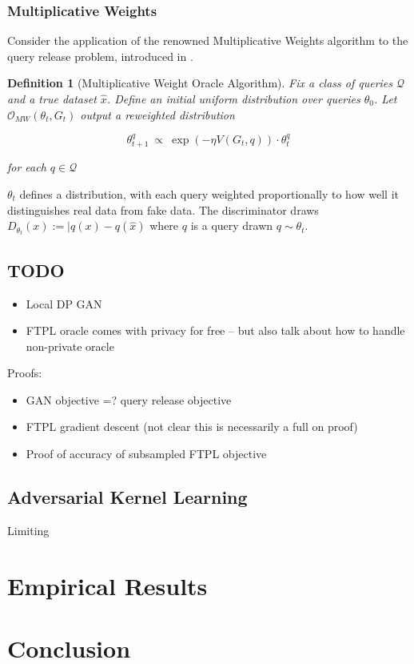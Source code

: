 \documentclass[]{article}
\newtheorem{definition}{Definition}[section]
\theoremstyle{definition}
\begin{document}
\subsubsection{Multiplicative Weights}

Consider the application of the renowned Multiplicative Weights algorithm to the query release problem, introduced in \cite{HR10}. 

\begin{definition}[Multiplicative Weight Oracle Algorithm]
    Fix a class of queries $\mathcal{Q}$ and a true dataset $\hat x$. Define an initial uniform distribution over queries $\theta_0$. Let $\mathcal{O}_{MW}(\theta_t, G_t)$ output a reweighted distribution 

    \begin{equation}
        \theta_{t+1}^q ~ \propto ~ \exp \left(-\eta V(G_t, q)\right) \cdot \theta_{t}^{q}
    \end{equation}

    for each $q \in \mathcal{Q}$
\end{definition}

$\theta_t$ defines a distribution, with each query weighted proportionally to how well it distinguishes real data from fake data. The discriminator draws  $D_{\theta_t}(x) := |q(x) - q(\hat x)$ where $q$ is a query drawn $q \sim \theta_t$. 

\subsection{TODO}
\begin{itemize}
    \item Local DP GAN
    \item FTPL oracle comes with privacy for free -- but also talk about how to handle non-private oracle
\end{itemize}

Proofs:

\begin{itemize}
    \item GAN objective =? query release objective
    \item FTPL gradient descent (not clear this is necessarily a full on proof)
    \item Proof of accuracy of subsampled FTPL objective
\end{itemize}

\subsection{Adversarial Kernel Learning}

Limiting 

\section{Empirical Results}

\section{Conclusion}




\newpage

\appendix
\end{document}
